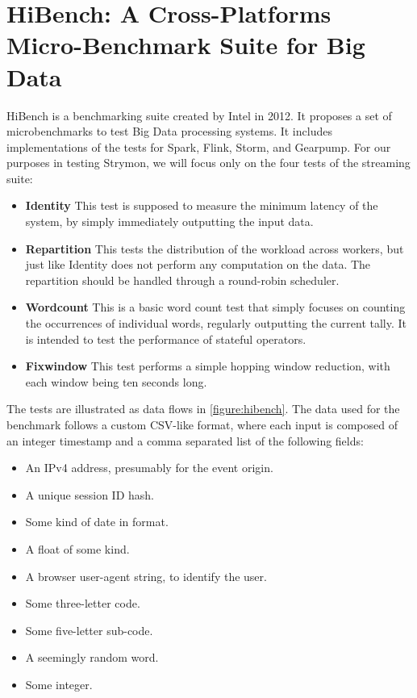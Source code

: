 \section{HiBench: A Cross-Platforms Micro-Benchmark Suite for Big Data\cite{hibench}}
HiBench is a benchmarking suite created by Intel in 2012. It proposes a set of microbenchmarks to test Big Data processing systems. It includes implementations of the tests for Spark, Flink, Storm, and Gearpump. For our purposes in testing Strymon, we will focus only on the four tests of the streaming suite:

\begin{itemize}
\item {\bfseries Identity} This test is supposed to measure the minimum latency of the system, by simply immediately outputting the input data.
\item {\bfseries Repartition} This tests the distribution of the workload across workers, but just like Identity does not perform any computation on the data. The repartition should be handled through a round-robin scheduler.
\item {\bfseries Wordcount} This is a basic word count test that simply focuses on counting the occurrences of individual words, regularly outputting the current tally. It is intended to test the performance of stateful operators.
\item {\bfseries Fixwindow} This test performs a simple hopping window reduction, with each window being ten seconds long.
\end{itemize}

The tests are illustrated as data flows in \autoref{figure:hibench}. The data used for the benchmark follows a custom CSV-like format, where each input is composed of an integer timestamp and a comma separated list of the following fields:

\begin{itemize}
\item {} An IPv4 address, presumably for the event origin.
\item {} A unique session ID hash.
\item {} Some kind of date in  format.
\item {} A float of some kind.
\item {} A browser user-agent string, to identify the user.
\item {} Some three-letter code.
\item {} Some five-letter sub-code.
\item {} A seemingly random word.
\item {} Some integer.
\end{itemize}

